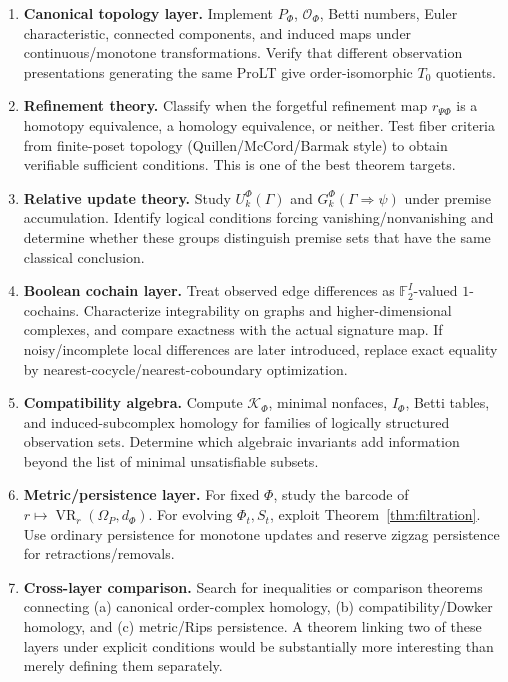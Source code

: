 \documentclass[11pt]{article}
\theoremstyle{definition}
\newcommand{\F}{\mathbb F_2}
\newcommand{\Om}{\Omega_P}
\newcommand{\OX}{\mathcal O}
\newcommand{\K}{\mathcal K}
\newcommand{\VR}{\operatorname{VR}}
\begin{document}
\begin{enumerate}[label=\textbf{P\arabic*.},leftmargin=2.6em]
\item \textbf{Canonical topology layer.} Implement $P_\Phi$, $\OX_\Phi$, Betti numbers, Euler characteristic, connected components, and induced maps under continuous/monotone transformations. Verify that different observation presentations generating the same ProLT give order-isomorphic $T_0$ quotients.

\item \textbf{Refinement theory.} Classify when the forgetful refinement map $r_{\Psi\Phi}$ is a homotopy equivalence, a homology equivalence, or neither. Test fiber criteria from finite-poset topology (Quillen/McCord/Barmak style) to obtain verifiable sufficient conditions. This is one of the best theorem targets.

\item \textbf{Relative update theory.} Study $U_k^\Phi(\Gamma)$ and $G_k^\Phi(\Gamma\Rightarrow\psi)$ under premise accumulation. Identify logical conditions forcing vanishing/nonvanishing and determine whether these groups distinguish premise sets that have the same classical conclusion.

\item \textbf{Boolean cochain layer.} Treat observed edge differences as $\F^I$-valued $1$-cochains. Characterize integrability on graphs and higher-dimensional complexes, and compare exactness with the actual signature map. If noisy/incomplete local differences are later introduced, replace exact equality by nearest-cocycle/nearest-coboundary optimization.

\item \textbf{Compatibility algebra.} Compute $\K_\Phi$, minimal nonfaces, $I_\Phi$, Betti tables, and induced-subcomplex homology for families of logically structured observation sets. Determine which algebraic invariants add information beyond the list of minimal unsatisfiable subsets.

\item \textbf{Metric/persistence layer.} For fixed $\Phi$, study the barcode of $r\mapsto\VR_r(\Om,d_\Phi)$. For evolving $\Phi_t,S_t$, exploit Theorem~\ref{thm:filtration}. Use ordinary persistence for monotone updates and reserve zigzag persistence for retractions/removals.

\item \textbf{Cross-layer comparison.} Search for inequalities or comparison theorems connecting (a) canonical order-complex homology, (b) compatibility/Dowker homology, and (c) metric/Rips persistence. A theorem linking two of these layers under explicit conditions would be substantially more interesting than merely defining them separately.
\end{enumerate}
\end{document}
